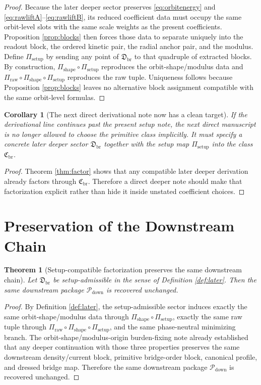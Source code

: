 \documentclass[11pt]{article}
\newcommand{\DownPkg}{\mathscr P_{\mathrm{down}}}
\newcommand{\PrimClass}{\mathfrak C_{\mathrm{br}}}
\newcommand{\PrimMap}{\Pi_{\mathrm{shape}}}
\newcommand{\RawMap}{\Pi_{\mathrm{raw}}}
\newcommand{\SetupMap}{\Pi_{\mathrm{setup}}}
\newtheorem{corollary}{Corollary}
\newtheorem{theorem}{Theorem}
\begin{document}
\begin{proof}
Because the later deeper sector preserves \eqref{eq:orbitenergy} and \eqref{eq:rawliftA}--\eqref{eq:rawliftB}, its reduced coefficient data must occupy the same orbit-level slots with the same scale weights as the present coefficients. Proposition \ref{prop:blocks} then forces those data to separate uniquely into the readout block, the ordered kinetic pair, the radial anchor pair, and the modulus. Define \(\SetupMap\) by sending any point of \(\mathfrak D_{\mathrm{br}}\) to that quadruple of extracted blocks. By construction, \(\PrimMap\circ\SetupMap\) reproduces the orbit-shape/modulus data and \(\RawMap\circ\PrimMap\circ\SetupMap\) reproduces the raw tuple. Uniqueness follows because Proposition \ref{prop:blocks} leaves no alternative block assignment compatible with the same orbit-level formulas.
\end{proof}

\begin{corollary}[The next direct derivational note now has a clean target]
\label{cor:cleantarget}
If the derivational line continues past the present setup note, the next direct manuscript is no longer allowed to choose the primitive class implicitly. It must specify a concrete later deeper sector \(\mathfrak D_{\mathrm{br}}\) together with the setup map \(\SetupMap\) into the class \(\PrimClass\).
\end{corollary}

\begin{proof}
Theorem \ref{thm:factor} shows that any compatible later deeper derivation already factors through \(\PrimClass\). Therefore a direct deeper note should make that factorization explicit rather than hide it inside unstated coefficient choices.
\end{proof}

\section{Preservation of the Downstream Chain}

\begin{theorem}[Setup-compatible factorization preserves the same downstream chain]
\label{thm:downstream}
Let \(\mathfrak D_{\mathrm{br}}\) be setup-admissible in the sense of Definition \ref{def:later}. Then the same downstream package \(\DownPkg\) is recovered unchanged.
\end{theorem}

\begin{proof}
By Definition \ref{def:later}, the setup-admissible sector induces exactly the same orbit-shape/modulus data through \(\PrimMap\circ\SetupMap\), exactly the same raw tuple through \(\RawMap\circ\PrimMap\circ\SetupMap\), and the same phase-neutral minimizing branch. The orbit-shape/modulus-origin burden-fixing note already established that any deeper continuation with those three properties preserves the same downstream density/current block, primitive bridge-order block, canonical profile, and dressed bridge map. Therefore the same downstream package \(\DownPkg\) is recovered unchanged.
\end{proof}
\end{document}
